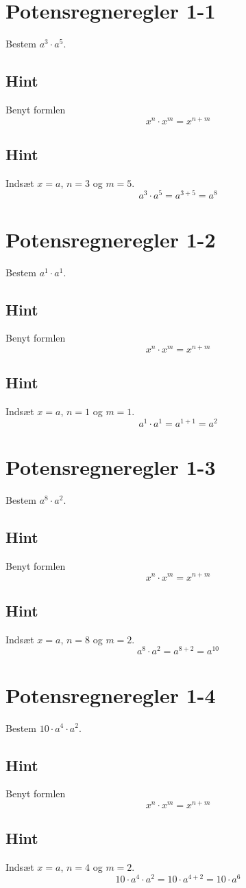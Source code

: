 \documentclass{article}
\newenvironment{exercise}[1]{\newpage\section{#1}}{}
\newcommand{\answerbox}[1]{\fbox{$#1$}}
\newcommand{\hint}{\subsection*{Hint}}
\begin{document}
\tableofcontents
\newpage

\begin{exercise}{Potensregneregler 1-1}

Bestem $a^3 \cdot a^5$.

\answerbox{a^8}

\hint

Benyt formlen
\[
x^n \cdot x^m = x^{n+m}
\]

\hint

Indsæt $x=a$, $n=3$ og $m=5$.
\[
a^3 \cdot a^5 = a^{3+5} = a^8
\]

\end{exercise}

\newpage

\begin{exercise}{Potensregneregler 1-2}
	
	Bestem $a^1 \cdot a^1$.
	
	\answerbox{a^2}
	
	\hint
	
	Benyt formlen
	\[
	x^n \cdot x^m = x^{n+m}
	\]
	
	\hint
	
	Indsæt $x=a$, $n=1$ og $m=1$.
	\[
	a^1 \cdot a^1 = a^{1+1} = a^2
	\]
	
\end{exercise}

\newpage

\begin{exercise}{Potensregneregler 1-3}
	
	Bestem $a^8 \cdot a^2$.
	
	\answerbox{a^{10}}
	
	\hint
	
	Benyt formlen
	\[
	x^n \cdot x^m = x^{n+m}
	\]
	
	\hint
	
	Indsæt $x=a$, $n=8$ og $m=2$.
	\[
	a^8 \cdot a^2 = a^{8+2} = a^{10}
	\]
	
\end{exercise}

\newpage

\begin{exercise}{Potensregneregler 1-4}
	
	Bestem $10 \cdot a^4 \cdot a^2$.
	
	\answerbox{10 \cdot a^6}
	
	\hint
	
	Benyt formlen
	\[
	x^n \cdot x^m = x^{n+m}
	\]
	
	\hint
	
	Indsæt $x=a$, $n=4$ og $m=2$.
	\[
	10 \cdot a^4 \cdot a^2 = 10 \cdot a^{4+2} =  10 \cdot a^6
	\]
	
\end{exercise}
\end{document}
